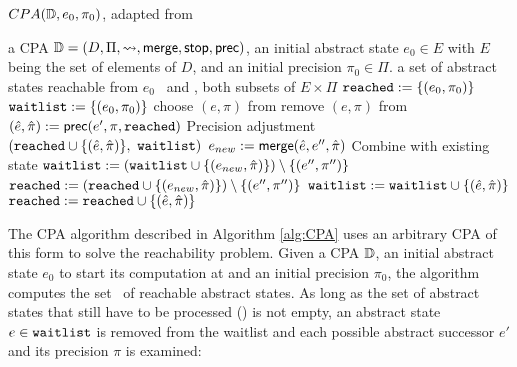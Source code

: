 \begin{algorithm}[t]
\caption{$CPA(\mathbb{D}, e_0, \pi_0)$, adapted from \cite{Beyer2008}}
\label{alg:CPA}
\begin{algorithmic}[1]

\Input a CPA $\mathbb{D} = (D, \Pi, \rightsquigarrow, \operatorname{\operatorname{\mathsf{merge}}}, \operatorname{\operatorname{\mathsf{stop}}}, \operatorname{\operatorname{\mathsf{prec}}})$,
	    an initial abstract state $e_0 \in E$ with $E$ being the set of elements of $D$,
	    and an initial precision $\pi_0 \in \Pi$.
\Output a set of abstract states reachable from $e_0$
\Variables \reachedSet\ and \waitlistSet , both subsets of $E \times \Pi$
\State $\texttt{reached} := \{ (e_0, \pi_0) \}$
\State $\texttt{waitlist} := \{ (e_0, \pi_0) \}$
\While{$\waitlistSet \neq \varnothing$}
	\State choose $(e, \pi)$ from \waitlistSet
	\State remove $(e, \pi)$ from \waitlistSet
		\State $(\hat{e}, \hat{\pi}) := \operatorname{\operatorname{\mathsf{prec}}}(e', \pi, \texttt{reached})$ \Comment Precision adjustment \label{alg:cpaPlus:precAdj}
		 \label{alg:cpa:isTarget}
			\State %
			\Return $(\reachedSet \cup \{ (\hat{e}, \hat{\pi}) \},\ \waitlistSet)$
		\EndIf
			\State $e_{new} := \operatorname{\operatorname{\mathsf{merge}}}(\hat{e}, e'', \hat{\pi})$ \Comment Combine with existing state \label{alg:cpa:mergeStart}
				\State $\texttt{waitlist} := (\texttt{waitlist} \cup \{ (e_{new}, \hat{\pi}) \}) \setminus \{ (e'',\pi '') \}$
				\State $\texttt{reached} := (\texttt{reached} \cup \{ (e_{new}, \hat{\pi}) \}) \setminus \{ (e'', \pi '') \}$
			\EndIf \label{alg:cpa:mergeStop}
		\EndFor
			\State $\texttt{waitlist} := \texttt{waitlist} \cup \{ (\hat{e}, \hat{\pi}) \}$
			\State $\texttt{reached} := \texttt{reached} \cup \{ (\hat{e}, \hat{\pi}) \}$
		\EndIf
	\EndFor
\EndWhile
\State %
\Return \reachedSet
\end{algorithmic}
\end{algorithm}

The CPA algorithm described in Algorithm \ref{alg:CPA} uses an arbitrary CPA of this form to solve the reachability problem.
Given a CPA $\mathbb{D}$, an initial abstract state $e_0$ to start its computation at and an initial precision $\pi_0$, the algorithm computes the set \reachedSet\ of reachable abstract states.
As long as the set of abstract states that still have to be processed (\waitlistSet) is not empty, an abstract state $e \in \texttt{waitlist}$ is removed from the waitlist
and each possible abstract successor $e'$ and its precision $\pi$ is examined:

